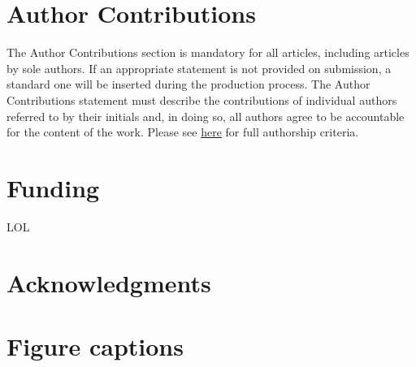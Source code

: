 \documentclass[utf8]{frontiersSCNS} %
\begin{document}
\section*{Author Contributions}

The Author Contributions section is mandatory for all articles, including articles by sole authors. If an appropriate statement is not provided on submission, a standard one will be inserted during the production process. The Author Contributions statement must describe the contributions of individual authors referred to by their initials and, in doing so, all authors agree to be accountable for the content of the work. Please see  \href{http://home.frontiersin.org/about/author-guidelines#AuthorandContributors}{here} for full authorship criteria.

\section*{Funding}
LOL

\section*{Acknowledgments}


 




\section*{Figure captions}





\end{document}
